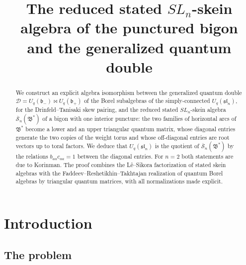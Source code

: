 \documentclass[12pt]{article}
\title{The reduced stated $SL_n$-skein algebra of the punctured bigon\\ and the generalized quantum double}
\author{}
\date{}
\theoremstyle{remark}
\newcommand{\U}{U_q}
\newcommand{\slN}{\mathfrak{sl}_n}
\newcommand{\bp}{\mathfrak b_+}
\newcommand{\bm}{\mathfrak b_-}
\newcommand{\redS}{\overline{\mathcal S}_n}
\newcommand{\Bstar}{\mathfrak B^*}
\newcommand{\cD}{\mathcal D}
\begin{document}
\maketitle

\begin{abstract}
We construct an explicit algebra isomorphism between the generalized
quantum double $\cD=\U(\bm)\bowtie\U(\bp)$ of the Borel subalgebras of
the simply-connected $\U(\slN)$, for the Drinfeld--Tanisaki skew
pairing, and the reduced stated $SL_n$-skein algebra $\redS(\Bstar)$ of
a bigon with one interior puncture: the two families of horizontal arcs
of $\Bstar$ become a lower and an upper triangular quantum matrix, whose
diagonal entries generate the two copies of the weight torus and whose
off-diagonal entries are root vectors up to toral factors. We deduce
that $\U(\slN)$ is the quotient of $\redS(\Bstar)$ by the relations
$b_{aa}c_{aa}=1$ between the diagonal entries.
For $n=2$ both statements are due to Korinman. The proof combines the
L\^e--Sikora factorization of stated skein algebras with the
Faddeev--Reshetikhin--Takhtajan realization of quantum Borel algebras
by triangular quantum matrices, with all normalizations made explicit.
\end{abstract}

\section{Introduction}

\subsection{The problem}
\end{document}
